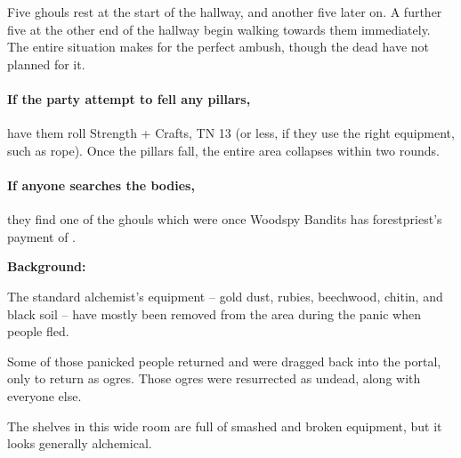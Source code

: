 \begin{multicols}{2}
Five ghouls rest at the start of the hallway, and another five later on.
A further five at the other end of the hallway begin walking towards them immediately.
The entire situation makes for the perfect ambush, though the dead have not planned for it.


\paragraph{If the party attempt to fell any pillars,}
have them roll Strength + Crafts, TN 13 (or less, if they use the right equipment, such as rope).
Once the pillars fall, the entire area collapses within two rounds.

\paragraph{If anyone searches the bodies,}
they find one of the ghouls which were once Woodspy Bandits has \gls{forestpriest}'s payment of \lootMedium.



\textbf{Background:}

The standard alchemist's equipment -- gold dust, rubies, beechwood, chitin, and black soil -- have mostly been removed from the area during the panic when people fled.

Some of those panicked people returned and were dragged back into the portal, only to return as ogres.
Those ogres were resurrected as undead, along with everyone else.

\begin{boxtext}

  The shelves in this wide room are full of smashed and broken equipment, but it looks generally alchemical.


\end{boxtext}
\end{multicols}
